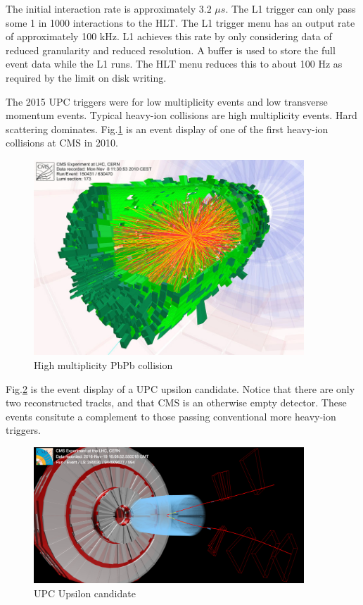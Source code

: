 The initial interaction rate is approximately $3.2$ $\mu s$. The L1 trigger can only pass some 1 in 1000 interactions to the HLT. The L1 trigger menu has an output rate of approximately 100 kHz. L1 achieves this rate by only considering data of reduced granularity and reduced resolution. A buffer is used to store the full event data while the L1 runs. The HLT menu reduces this to about 100 Hz as required by the limit on disk writing.

The 2015 UPC triggers were for low multiplicity events and low transverse momentum events. Typical heavy-ion collisions are high multiplicity events. Hard scattering dominates. Fig.\ref{fig:eventdisplayHI} is an event display of one of the first heavy-ion collisions at CMS in 2010.

\begin{figure}[h!]
\begin{centering}
\includegraphics[width=4in]{Chapter3/importfigs/cms_firstleadcoll.jpg}
\par\end{centering}
\caption{High multiplicity PbPb collision \label{fig:eventdisplayHI}}
\end{figure}

Fig.\ref{fig:eventdisplayUPCUps} is the event display of a UPC upsilon candidate. Notice that there are only two reconstructed tracks, and that CMS is an otherwise empty detector. These events consitute a complement to those passing conventional more heavy-ion triggers.

\begin{figure}[h!]
\begin{centering}
\includegraphics[width=4in]{Chapter3/importfigs/upcJpsi_run285530_lumi594_event944509077_v0.png}
\par\end{centering}
\caption{UPC Upsilon candidate \label{fig:eventdisplayUPCUps}}
\end{figure}

